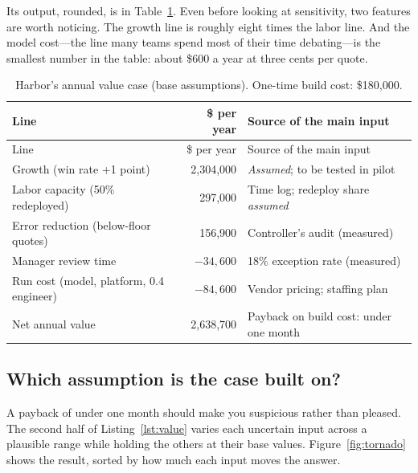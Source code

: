 Its output, rounded, is in Table~\ref{tab:value}. Even before looking at sensitivity, two features are worth noticing. The growth line is roughly eight times the labor line. And the model cost---the line many teams spend most of their time debating---is the smallest number in the table: about \$600 a year at three cents per quote.

\begingroup
\small
\begin{longtable}{@{}lrl@{}}
\caption{Harbor's annual value case (base assumptions). One-time build cost: \$180{,}000.}\label{tab:value}\\
\toprule
\rowcolor{coHead} Line & \$ per year & Source of the main input \\
\midrule
\endfirsthead
\toprule
\rowcolor{coHead} Line & \$ per year & Source of the main input \\
\midrule
\endhead
Growth (win rate +1 point) & 2{,}304{,}000 & \emph{Assumed}; to be tested in pilot \\
Labor capacity (50\% redeployed) & 297{,}000 & Time log; redeploy share \emph{assumed} \\
Error reduction (below-floor quotes) & 156{,}900 & Controller's audit (measured) \\
Manager review time & $-34{,}600$ & 18\% exception rate (measured) \\
Run cost (model, platform, 0.4 engineer) & $-84{,}600$ & Vendor pricing; staffing plan \\
\midrule
\rowcolor{coGreenBg} Net annual value & 2{,}638{,}700 & Payback on build cost: under one month \\
\bottomrule
\end{longtable}
\endgroup

\subsection{Which assumption is the case built on?}

A payback of under one month should make you suspicious rather than pleased. The second half of Listing~\ref{lst:value} varies each uncertain input across a plausible range while holding the others at their base values. Figure~\ref{fig:tornado} shows the result, sorted by how much each input moves the answer.

